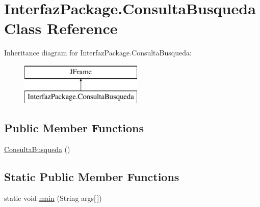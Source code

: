 \hypertarget{class_interfaz_package_1_1_consulta_busqueda}{}\section{Interfaz\+Package.\+Consulta\+Busqueda Class Reference}
\label{class_interfaz_package_1_1_consulta_busqueda}
Inheritance diagram for Interfaz\+Package.\+Consulta\+Busqueda\+:\begin{figure}[H]
\begin{center}
\leavevmode
\includegraphics[height=2.000000cm]{class_interfaz_package_1_1_consulta_busqueda}
\end{center}
\end{figure}
\subsection*{Public Member Functions}
\begin{DoxyCompactItemize}
\item 
\mbox{\hyperlink{class_interfaz_package_1_1_consulta_busqueda_a0947d604c6fd72d808f32c4d3f9b2cc9}{Consulta\+Busqueda}} ()
\end{DoxyCompactItemize}
\subsection*{Static Public Member Functions}
\begin{DoxyCompactItemize}
\item 
static void \mbox{\hyperlink{class_interfaz_package_1_1_consulta_busqueda_aa3e2512eb5d6df32073c18d7c12026c2}{main}} (String args\mbox{[}$\,$\mbox{]})
\end{DoxyCompactItemize}
